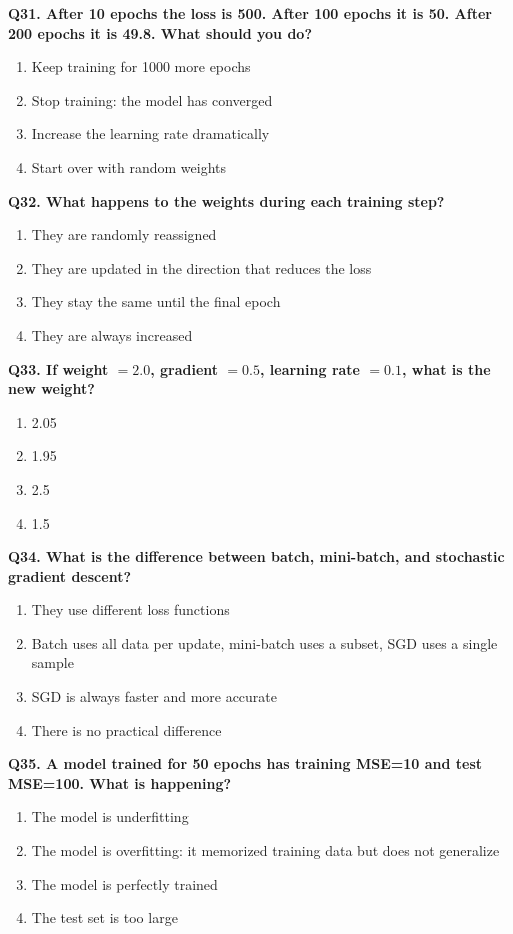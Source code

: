 \documentclass[12pt, a4paper]{article}
\newcommand{\question}[1]{\vspace{0.6em}\noindent\textbf{#1}}
\begin{document}
\question{Q31. After 10 epochs the loss is 500. After 100 epochs it is 50. After 200 epochs it is 49.8. What should you do?}
\begin{enumerate}[label=\alph*)]
    \item Keep training for 1000 more epochs
    \item Stop training: the model has converged
    \item Increase the learning rate dramatically
    \item Start over with random weights
\end{enumerate}

\question{Q32. What happens to the weights during each training step?}
\begin{enumerate}[label=\alph*)]
    \item They are randomly reassigned
    \item They are updated in the direction that reduces the loss
    \item They stay the same until the final epoch
    \item They are always increased
\end{enumerate}

\question{Q33. If weight $= 2.0$, gradient $= 0.5$, learning rate $= 0.1$, what is the new weight?}
\begin{enumerate}[label=\alph*)]
    \item 2.05
    \item 1.95
    \item 2.5
    \item 1.5
\end{enumerate}

\question{Q34. What is the difference between batch, mini-batch, and stochastic gradient descent?}
\begin{enumerate}[label=\alph*)]
    \item They use different loss functions
    \item Batch uses all data per update, mini-batch uses a subset, SGD uses a single sample
    \item SGD is always faster and more accurate
    \item There is no practical difference
\end{enumerate}

\question{Q35. A model trained for 50 epochs has training MSE=10 and test MSE=100. What is happening?}
\begin{enumerate}[label=\alph*)]
    \item The model is underfitting
    \item The model is overfitting: it memorized training data but does not generalize
    \item The model is perfectly trained
    \item The test set is too large
\end{enumerate}
\end{document}
